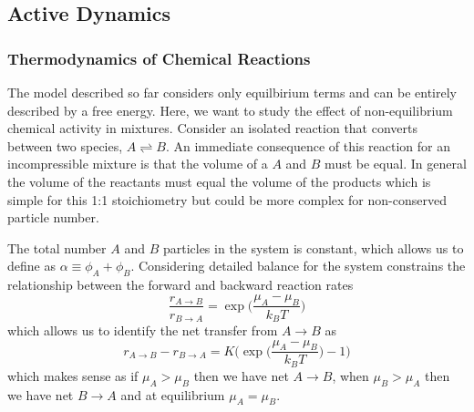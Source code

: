 \subsection{Active Dynamics}

\subsubsection{Thermodynamics of Chemical Reactions}
The model described so far considers only equilbirium terms and can be entirely described by a free energy. Here, we want to study the effect of non-equilibrium chemical activity in mixtures. Consider an isolated reaction that converts between two species, $A \rightleftharpoons B$. An immediate consequence of this reaction for an incompressible mixture is that the volume of a $A$ and $B$ must be equal. In general the volume of the reactants must equal the volume of the products which is simple for this 1:1 stoichiometry but could be more complex for non-conserved particle number.

The total number $A$ and $B$ particles in the system is constant, which allows us to define as $\alpha \equiv \phi_A+\phi_B$. Considering detailed balance for the system constrains the relationship between the forward and backward reaction rates
\begin{equation}
    \frac{r_{A \rightarrow B}}{r_{B \rightarrow A}} = \exp\Bigg(\frac{\mu_A - \mu_B}{k_B T}\Bigg)
    \label{db_constr}
\end{equation}
which allows us to identify the net transfer from $A \rightarrow B$ as
\begin{equation}
    r_{A \rightarrow B} - r_{B \rightarrow A} = K\Bigg(\exp\bigg(\frac{\mu_A - \mu_B}{k_B T}\bigg)-1\Bigg)
    \label{react_rates}
\end{equation}
which makes sense as if $\mu_A > \mu_B$ then we have net $A \rightarrow B$, when $\mu_B > \mu_A$ then we have net $B \rightarrow A$ and at equilibrium $\mu_A = \mu_B$\cite{weber2019physics}.

